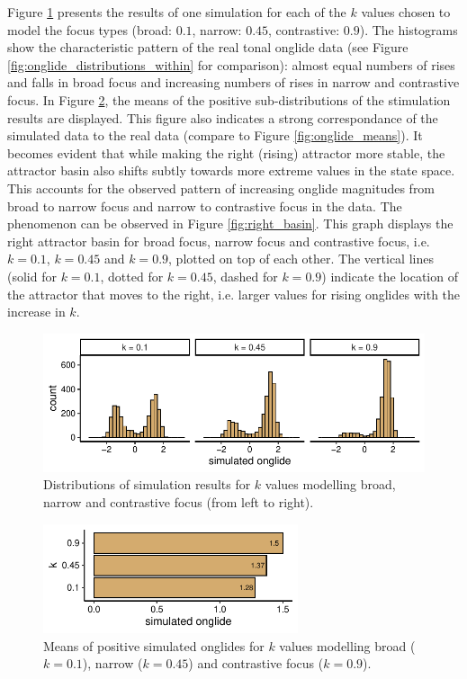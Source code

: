 Figure \ref{fig:simulation_br_na_co} presents the results of one simulation for each of the $k$ values chosen to model the focus types (broad: $0.1$, narrow: $0.45$, contrastive: $0.9$). The histograms show the characteristic pattern of the real tonal onglide data (see Figure \ref{fig:onglide_distributions_within} for comparison): almost equal numbers of rises and falls in broad focus and increasing numbers of rises in narrow and contrastive focus. In Figure \ref{fig:simulation_means_br_na_co}, the means of the positive sub-distributions of the stimulation results are displayed. This figure also indicates a strong correspondance of the simulated data to the real data (compare to Figure \ref{fig:onglide_means}).  It becomes evident that while making the right (rising) attractor more stable, the attractor basin also shifts subtly towards more extreme values in the state space. This accounts for the observed pattern of increasing onglide magnitudes from broad to narrow focus and narrow to contrastive focus in the data. The phenomenon can be observed in Figure \ref{fig:right_basin}. This graph displays the right attractor basin for broad focus, narrow focus and contrastive focus, i.e. $k=0.1$, $k=0.45$ and $k=0.9$, plotted on top of each other. The vertical lines (solid for $k=0.1$, dotted for $k=0.45$, dashed for $k=0.9$)  indicate the location of the attractor that moves to the right, i.e. larger values for rising onglides with the increase in $k$.

\begin{figure}
\includegraphics[width=\textwidth]{figures/ch6/onglide_all_within.pdf}
\caption[Distributions of simulation results for $k$ values modelling broad ($k=0.1$), narrow ($k=0.45$) and contrastive focus ($k=0.9$).]{Distributions of simulation results for $k$ values modelling broad, narrow and contrastive focus (from left to right).}
\label{fig:simulation_br_na_co}
\end{figure}

\begin{figure}
\includegraphics[width=7.5cm]{figures/ch6/positive_means_within.pdf}
\caption{Means of positive simulated onglides for $k$ values modelling broad ($k=0.1$), narrow ($k=0.45$) and contrastive focus ($k=0.9$).}
\label{fig:simulation_means_br_na_co}
\end{figure}


